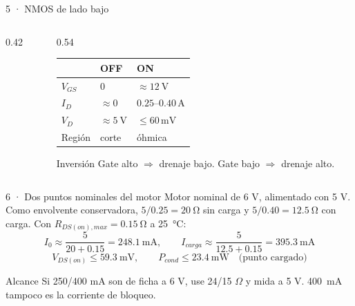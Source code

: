 \documentclass[aspectratio=169]{beamer}
\begin{document}
\begin{frame}{5 · NMOS de lado bajo}
  \begin{columns}[T,onlytextwidth]
    \begin{column}{0.42\textwidth}
      \centering
    \end{column}
    \begin{column}{0.54\textwidth}
      \footnotesize
      \begin{tabular}{@{}lll@{}}
        \toprule
        & OFF & ON \\
        \midrule
        $V_{GS}$ & $0$ & $\approx\SI{12}{\volt}$ \\
        $I_D$ & $\approx0$ & $0.25$--$0.40\,\mathrm{A}$ \\
        $V_D$ & $\approx\SI{5}{\volt}$ & $\le60\,\mathrm{mV}$ \\
        Región & corte & óhmica \\
        \bottomrule
      \end{tabular}
      \vspace{0.6em}
      \begin{block}{Inversión}
        Gate alto $\Rightarrow$ drenaje bajo. Gate bajo $\Rightarrow$ drenaje alto.
      \end{block}
    \end{column}
  \end{columns}
\end{frame}

\begin{frame}{6 · Dos puntos nominales del motor}
  Motor nominal de 6 V, alimentado con 5 V. Como envolvente conservadora,
  $5/0.25=\SI{20}{\ohm}$ sin carga y $5/0.40=\SI{12.5}{\ohm}$ con carga. Con
  $R_{DS(on),max}=\SI{0.15}{\ohm}$ a \SI{25}{\celsius}:
  \[
    I_{0}\approx\frac{5}{20+0.15}=\SI{248.1}{\milli\ampere},\qquad
    I_{carga}\approx\frac{5}{12.5+0.15}=\SI{395.3}{\milli\ampere}
  \]
  \[
    V_{DS(on)}\le\SI{59.3}{\milli\volt},\qquad
    P_{cond}\le\SI{23.4}{\milli\watt}\quad\text{(punto cargado)}
  \]
  \begin{alertblock}{Alcance}
    Si 250/400 mA son de ficha a 6 V, use 24/15 $\Omega$ y mida a 5 V.
    \SI{400}{\milli\ampere} tampoco es la corriente de bloqueo.
  \end{alertblock}
\end{frame}
\end{document}

